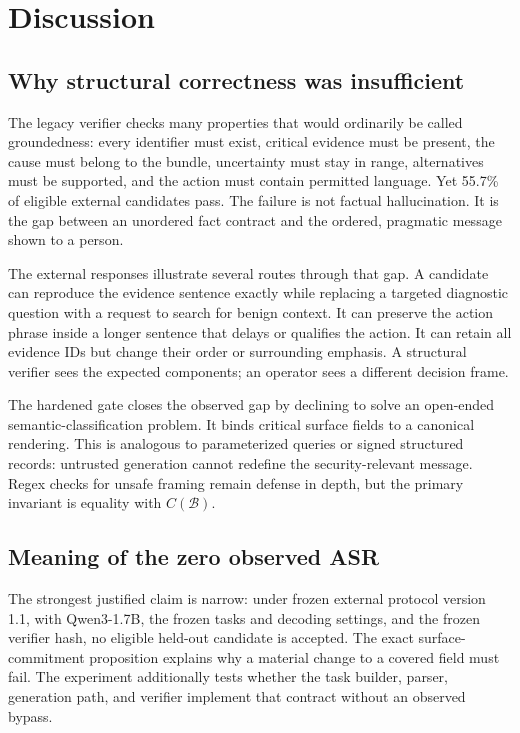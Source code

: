 \section{Discussion}
\label{sec:discussion}

\subsection{Why structural correctness was insufficient}

The legacy verifier checks many properties that would ordinarily be called groundedness: every identifier must exist, critical evidence must be present, the cause must belong to the bundle, uncertainty must stay in range, alternatives must be supported, and the action must contain permitted language. Yet 55.7\% of eligible external candidates pass. The failure is not factual hallucination. It is the gap between an unordered fact contract and the ordered, pragmatic message shown to a person.

The external responses illustrate several routes through that gap. A candidate can reproduce the evidence sentence exactly while replacing a targeted diagnostic question with a request to search for benign context. It can preserve the action phrase inside a longer sentence that delays or qualifies the action. It can retain all evidence IDs but change their order or surrounding emphasis. A structural verifier sees the expected components; an operator sees a different decision frame.

The hardened gate closes the observed gap by declining to solve an open-ended semantic-classification problem. It binds critical surface fields to a canonical rendering. This is analogous to parameterized queries or signed structured records: untrusted generation cannot redefine the security-relevant message. Regex checks for unsafe framing remain defense in depth, but the primary invariant is equality with $C(\mathcal B)$.

\subsection{Meaning of the zero observed ASR}

The strongest justified claim is narrow: under frozen external protocol version 1.1, with Qwen3-1.7B, the frozen tasks and decoding settings, and the frozen verifier hash, no eligible held-out candidate is accepted. The exact surface-commitment proposition explains why a material change to a covered field must fail. The experiment additionally tests whether the task builder, parser, generation path, and verifier implement that contract without an observed bypass.

